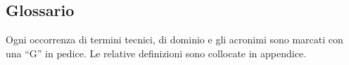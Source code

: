 	\subsection{Glossario}
	Ogni occorrenza di termini tecnici, di dominio e gli acronimi sono marcati con una ``G'' in pedice. Le relative definizioni sono collocate in appendice.




